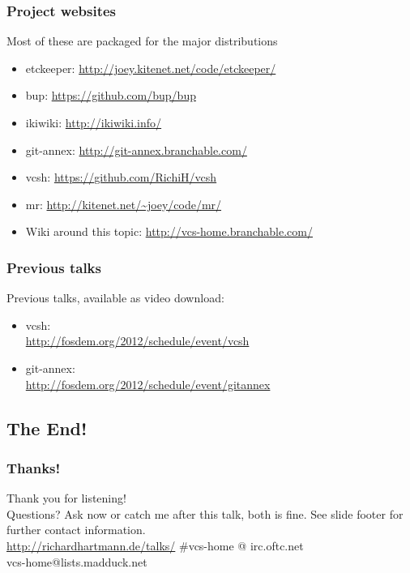 \documentclass[t]{beamer}
\begin{document}
\begin{frame}
	\frametitle{Project websites}
	Most of these are packaged for the major distributions
	\begin{itemize}
		\item etckeeper: \url{http://joey.kitenet.net/code/etckeeper/}
		\item bup: \url{https://github.com/bup/bup}
		\item ikiwiki: \url{http://ikiwiki.info/}
		\item git-annex: \url{http://git-annex.branchable.com/}
		\item vcsh: \url{https://github.com/RichiH/vcsh}
		\item mr: \url{http://kitenet.net/~joey/code/mr/}
		\item Wiki around this topic: \url{http://vcs-home.branchable.com/}
	\end{itemize}
\end{frame}

\begin{frame}
	\frametitle{Previous talks}
	Previous talks, available as video download:
	\begin{itemize}
		\item vcsh: \\
			\url{http://fosdem.org/2012/schedule/event/vcsh}
		\item git-annex: \\
			\url{http://fosdem.org/2012/schedule/event/gitannex}
	\end{itemize}
\end{frame}

\subsection{The End!}

\begin{frame}
	\frametitle{Thanks!}
		\begin{center}
			\vfill
			Thank you for listening!\\
			\vfill
			Questions? Ask now or catch me after this talk, both is fine.
			\vfill
			See slide footer for further contact information.\\
			\vfill
			\url{http://richardhartmann.de/talks/}
			\vfill
			\#vcs-home @ irc.oftc.net\\
			vcs-home@lists.madduck.net
			\vfill
		\end{center}
\end{frame}
\end{document}
